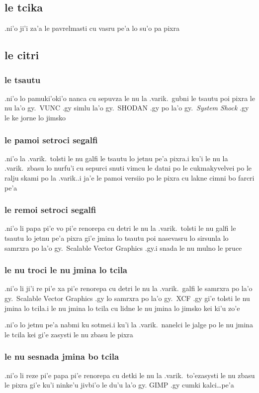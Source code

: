 \documentclass{report}
\begin{document}
\subsection{le tcika}
.ni'o ji'i za'a le pavrelmasti cu vasru pe'a lo su'o pa pixra
\subsection{le citri}
\subsubsection{le tsautu}
.ni'o lo pamuki'oki'o nanca cu sepuvza le nu la .varik.\ gubni le tsautu poi pixra le nu la'o gy.\ VUNC .gy simlu la'o gy.\ SHODAN .gy po la'o gy.\ \textit{System Shock} .gy le ke jorne lo jimsko
\subsubsection{le pamoi setroci segalfi}
.ni'o la .varik.\ tolsti le nu galfi le tsautu lo jetnu pe'a pixra\@  .i ku'i le nu la .varik.\ zbasu lo nurfu'i cu sepurci snuti vimcu le datni po le cukmakyvelvei po le ralju skami po la .varik.\@  .i ja'e le pamoi versiio po le pixra cu lakne cimni bo farcri pe'a
\subsubsection{le remoi setroci segalfi}
.ni'o li papa pi'e vo pi'e renorepa cu detri le nu la .varik.\ tolsti le nu galfi le tsautu lo jetnu pe'a pixra gi'e jmina lo tsautu poi nasevasru lo sirsunla lo samrxra po la'o gy.\ Scalable Vector Graphics .gy\@  .i snada le nu mulno le pruce
\subsubsection{le nu troci le nu jmina lo tcila}
.ni'o li ji'i re pi'e xa pi'e renorepa cu detri le nu la .varik.\ galfi le samrxra po la'o gy.\ Scalable Vector Graphics .gy lo samrxra po la'o gy.\ XCF .gy gi'e tolsti le nu jmina lo tcila\@  .i le nu jmina lo tcila cu lidne le nu jmina lo jimsko kei ki'u zo'e

.ni'o lo jetnu pe'a nabmi ku sotmei\@  .i ku'i la .varik.\ nanelci le jalge po le nu jmina le tcila kei gi'e zasysti le nu zbasu le pixra
\subsubsection{le nu sesnada jmina bo tcila}
.ni'o li reze pi'e papa pi'e renorepa cu detki le nu la .varik.\ to'ezasysti le nu zbasu le pixra gi'e ku'i ninke'u jivbi'o le du'u la'o gy. GIMP .gy cumki kalci\ldots pe'a
\end{document}

